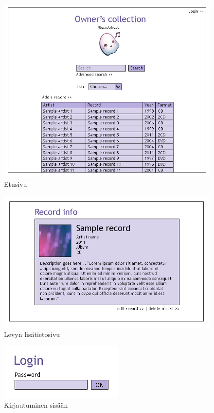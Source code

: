 \documentclass[a4paper,12pt]{report}
\begin{document}
\begin{figure}[H]
\begin{center}
\includegraphics[width=\textwidth]{mainwindow2}
\end{center}
\caption{Etusivu}
\end{figure}

\begin{figure}[H]
\begin{center}
\includegraphics[width=\textwidth]{recordinfopage}
\end{center}
\caption{Levyn lisätietosivu}
\end{figure}

\begin{figure}[H]
\begin{center}
\includegraphics[]{login}
\end{center}
\caption{Kirjautuminen sisään}
\end{figure}
\end{document}
